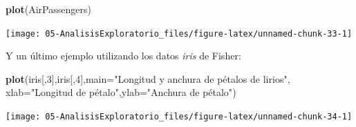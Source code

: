 \documentclass[]{book}
\newenvironment{Shaded}{\begin{snugshade}}{\end{snugshade}}
\newcommand{\KeywordTok}[1]{\textcolor[rgb]{0.13,0.29,0.53}{\textbf{#1}}}
\newcommand{\DataTypeTok}[1]{\textcolor[rgb]{0.13,0.29,0.53}{#1}}
\newcommand{\DecValTok}[1]{\textcolor[rgb]{0.00,0.00,0.81}{#1}}
\newcommand{\StringTok}[1]{\textcolor[rgb]{0.31,0.60,0.02}{#1}}
\newcommand{\OperatorTok}[1]{\textcolor[rgb]{0.81,0.36,0.00}{\textbf{#1}}}
\newcommand{\NormalTok}[1]{#1}
\begin{document}
\begin{Shaded}
\begin{Highlighting}[]
\KeywordTok{plot}\NormalTok{(AirPassengers)}
\end{Highlighting}
\end{Shaded}

\begin{center}\texttt{[image: 05-AnalisisExploratorio\_files/figure-latex/unnamed-chunk-33-1]} \end{center}

Y un último ejemplo utilizando los datos \emph{iris} de Fisher:

\begin{Shaded}
\begin{Highlighting}[]
\KeywordTok{plot}\NormalTok{(iris[,}\DecValTok{3}\NormalTok{],iris[,}\DecValTok{4}\NormalTok{],}\DataTypeTok{main=}\StringTok{"Longitud y anchura de pétalos de lirios"}\NormalTok{,}
     \DataTypeTok{xlab=}\StringTok{"Longitud de pétalo"}\NormalTok{,}\DataTypeTok{ylab=}\StringTok{"Anchura de pétalo"}\NormalTok{)}
\end{Highlighting}
\end{Shaded}

\begin{center}\texttt{[image: 05-AnalisisExploratorio\_files/figure-latex/unnamed-chunk-34-1]} \end{center}

\begin{Shaded}
\end{Shaded}
\end{document}
